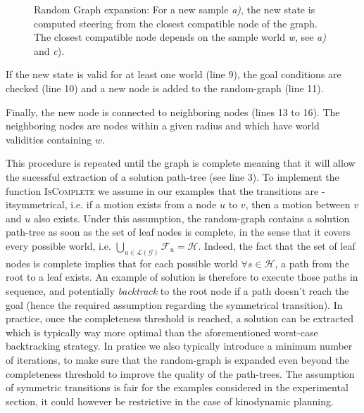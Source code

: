 \documentclass[letterpaper, 10 pt, conference]{ieeeconf}  %
\begin{document}


\begin{figure}[!htb]
 \caption{Random Graph expansion: For a new sample \textit{a)}, the new state is computed steering from the closest compatible node of the graph. The closest compatible node depends on the sample world \textit{w}, see \textit{a)} and \textit{c}).}
 \label{fig:expansion}
\end{figure}
If the new state is valid for at least one world (line 9), the goal conditions are checked (line 10) and a new node is added to the random-graph (line 11).

Finally, the new node is connected to neighboring nodes (lines 13 to 16). The neighboring nodes are nodes within a given radius and which have world validities containing $w$.

This procedure is repeated until the graph is complete meaning that it will allow the sucessful extraction of a solution path-tree (see line 3). To implement the function \textsc{IsComplete} we assume in our examples that the transitions are \text-it{symmetrical}, i.e. if a motion exists from a node $u$ to $v$, then a motion between $v$ and $u$ also exists. Under this assumption, the random-graph contains a solution path-tree as soon as the set of leaf nodes is complete, in the sense that it covers every possible world, i.e.  $\bigcup_{u \in \mathcal{\mathcal{L}(G)}} \mathcal{F}_u = \mathcal{H}$. Indeed, the fact that the set of leaf nodes is complete implies that for each possible world $\forall s \in \mathcal{H}$, a path from the root to a leaf exists. An example of solution is therefore to execute those paths in sequence, and  potentially \textit{backtrack} to the root node if a path doesn't reach the goal (hence the required assumption regarding the symmetrical transition). In practice, once the completeness threshold is reached, a solution can be extracted which is typically way more optimal than the aforementioned worst-case backtracking strategy. In pratice we also typically introduce a minimum number of iterations, to make sure that the random-graph is expanded even beyond the completeness threshold to improve the quality of the path-trees. The assumption of symmetric transitions is fair for the examples considered in the experimental section, it could however be restrictive in the case of kinodynamic planning. %
\end{document}
